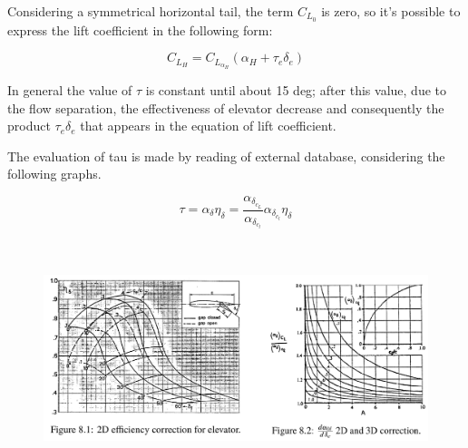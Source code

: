   
Considering a symmetrical horizontal tail, the term $C_{L_0}$ is zero, so it's possible to express the lift coefficient in the following form:


\begin{equation}
C_{L_H}= C_{L_{{\alpha}_H}} \left ( \alpha_H + \tau_e \delta_e \right)
\end{equation}
  		
 In general the value of $\tau$ is constant until about 15 deg; after this value, due to the flow separation, the effectiveness of elevator decrease and consequently the product $ \tau_e \delta_e$ that appears in the equation of lift coefficient.
		
		
The evaluation of tau is made by reading of external database, considering the following graphs.
	
\begin{equation}
\tau = \alpha_{\delta} \eta_{\delta} = \frac{\alpha_{{\delta}_{c_L}}}{\alpha_{{\delta}_{c_l}}}\alpha_{{\delta}_{c_l}} \eta_{\delta}
\end{equation}



%
%

\begin{figure}[H]
\centering
{\includegraphics[height=6.79cm]{Immagini/alfadeltanew.png}} 
\label{efficiency}
\end{figure} 		


